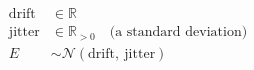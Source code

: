\begin{align}
  \mathrm{drift} &\in \mathbb{R} \\
  \mathrm{jitter} &\in \mathbb{R}_{>0} \quad\text{(a standard deviation)} \\
  E &\sim \mathcal{N}\!\left(\mathrm{drift},\ \mathrm{jitter}\right)
\end{align}
